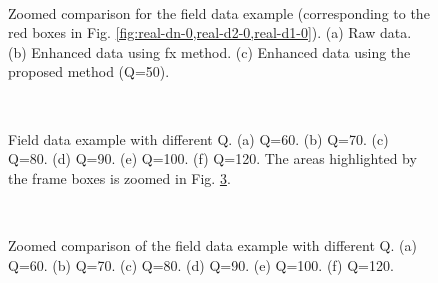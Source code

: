 \begin{figure}[htb!]
 \centering
 \\
  \caption{Zoomed comparison for the field data example (corresponding to the red boxes in Fig. \ref{fig:real-dn-0,real-d2-0,real-d1-0}). (a) Raw data. (b) Enhanced data using fx method. (c) Enhanced data using the proposed method (Q=50).}
  \label{fig:real-dn-z2,real-d2-z2,real-d1-z2}
\end{figure}


\begin{figure}[ht!]
 \centering
   \\
  \caption{Field data example with different Q. (a) Q=60. (b) Q=70. (c) Q=80. (d) Q=90. (e) Q=100. (f) Q=120. The areas highlighted by the frame boxes is zoomed in Fig. \ref{fig:real-d1-q60-z1,real-d1-q70-z1,real-d1-q80-z1,real-d1-q90-z1,real-d1-q100-z1,real-d1-q120-z1}.}
  \label{fig:real-d1-q60-0,real-d1-q70-0,real-d1-q80-0,real-d1-q90-0,real-d1-q100-0,real-d1-q120-0}
\end{figure}

\begin{figure}[ht!]
 \centering
   \\
  \caption{Zoomed comparison of the field data example with different Q. (a) Q=60. (b) Q=70. (c) Q=80. (d) Q=90. (e) Q=100. (f) Q=120.}
  \label{fig:real-d1-q60-z1,real-d1-q70-z1,real-d1-q80-z1,real-d1-q90-z1,real-d1-q100-z1,real-d1-q120-z1}
\end{figure}


